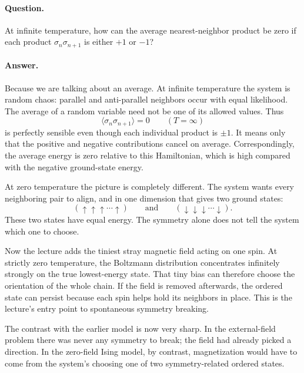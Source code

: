 \paragraph{Question.} At infinite temperature, how can the average nearest-neighbor product be zero if each product \(\sigma_n\sigma_{n+1}\) is either \(+1\) or \(-1\)?

\paragraph{Answer.} Because we are talking about an average. At infinite temperature the system is random chaos: parallel and anti-parallel neighbors occur with equal likelihood. The average of a random variable need not be one of its allowed values. Thus
\begin{equation}
\langle \sigma_n \sigma_{n+1}\rangle = 0
\qquad (T=\infty)
\end{equation}
is perfectly sensible even though each individual product is \(\pm1\). It means only that the positive and negative contributions cancel on average. Correspondingly, the average energy is zero relative to this Hamiltonian, which is high compared with the negative ground-state energy.

At zero temperature the picture is completely different. The system wants every neighboring pair to align, and in one dimension that gives two ground states:
\begin{equation}
(\uparrow \uparrow \uparrow \cdots \uparrow)
\qquad \text{and} \qquad
(\downarrow \downarrow \downarrow \cdots \downarrow).
\end{equation}
These two states have equal energy. The symmetry alone does not tell the system which one to choose.

Now the lecture adds the tiniest stray magnetic field acting on one spin. At strictly zero temperature, the Boltzmann distribution concentrates infinitely strongly on the true lowest-energy state. That tiny bias can therefore choose the orientation of the whole chain. If the field is removed afterwards, the ordered state can persist because each spin helps hold its neighbors in place. This is the lecture's entry point to spontaneous symmetry breaking.

The contrast with the earlier model is now very sharp. In the external-field problem there was never any symmetry to break; the field had already picked a direction. In the zero-field Ising model, by contrast, magnetization would have to come from the system's choosing one of two symmetry-related ordered states.

